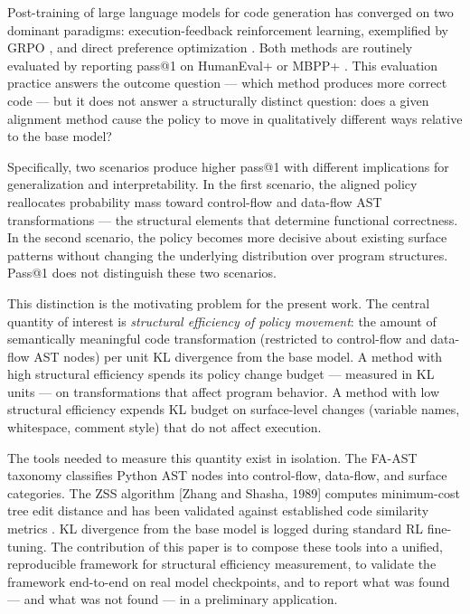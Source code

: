 
Post-training of large language models for code generation has converged on two dominant paradigms: execution-feedback reinforcement learning, exemplified by GRPO \citep{Shaoetal2024}, and direct preference optimization \citep{Rafailovetal2023}. Both methods are routinely evaluated by reporting pass@1 on HumanEval+ \citep{Liuetal2023} or MBPP+ \citep{Liuetal2023}. This evaluation practice answers the outcome question — which method produces more correct code — but it does not answer a structurally distinct question: does a given alignment method cause the policy to move in qualitatively different ways relative to the base model?

Specifically, two scenarios produce higher pass@1 with different implications for generalization and interpretability. In the first scenario, the aligned policy reallocates probability mass toward control-flow and data-flow AST transformations — the structural elements that determine functional correctness. In the second scenario, the policy becomes more decisive about existing surface patterns without changing the underlying distribution over program structures. Pass@1 does not distinguish these two scenarios.

This distinction is the motivating problem for the present work. The central quantity of interest is \textit{structural efficiency of policy movement}: the amount of semantically meaningful code transformation (restricted to control-flow and data-flow AST nodes) per unit KL divergence from the base model. A method with high structural efficiency spends its policy change budget — measured in KL units — on transformations that affect program behavior. A method with low structural efficiency expends KL budget on surface-level changes (variable names, whitespace, comment style) that do not affect execution.

The tools needed to measure this quantity exist in isolation. The FA-AST taxonomy \citep{Wangetal2020} classifies Python AST nodes into control-flow, data-flow, and surface categories. The ZSS algorithm [Zhang and Shasha, 1989] computes minimum-cost tree edit distance and has been validated against established code similarity metrics \citep{Dingetal2024}. KL divergence from the base model is logged during standard RL fine-tuning. The contribution of this paper is to compose these tools into a unified, reproducible framework for structural efficiency measurement, to validate the framework end-to-end on real model checkpoints, and to report what was found — and what was not found — in a preliminary application.

